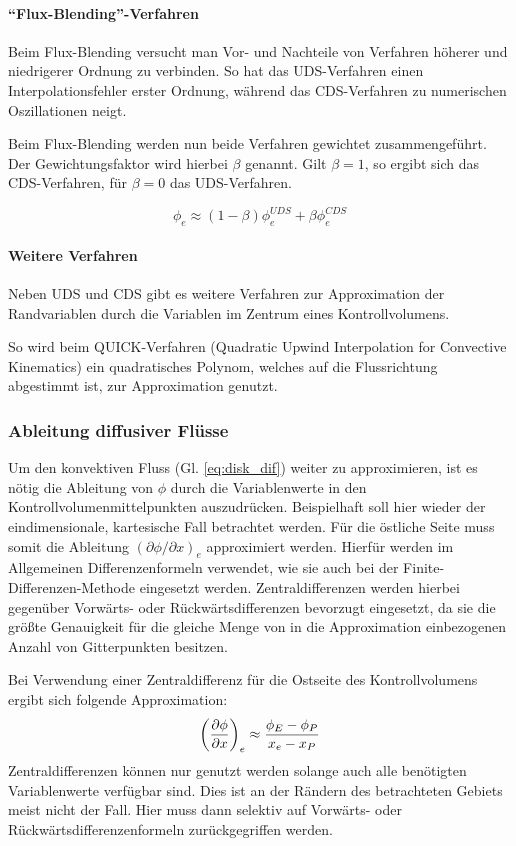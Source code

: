 \paragraph{``Flux-Blending''-Verfahren}

Beim Flux-Blending versucht man Vor- und Nachteile von Verfahren höherer und niedrigerer
Ordnung zu verbinden. So hat das UDS-Verfahren einen Interpolationsfehler erster Ordnung,
während das CDS-Verfahren zu numerischen Oszillationen neigt.

Beim Flux-Blending werden nun beide Verfahren gewichtet zusammengeführt. Der Gewichtungsfaktor
wird hierbei $\beta$ genannt. Gilt $\beta = 1$, so ergibt sich das CDS-Verfahren, für
$\beta = 0$ das UDS-Verfahren.

\begin{equation}
  \phi_e \approx (1-\beta)\phi_e^{UDS} + \beta \phi_e^{CDS}
  \label{eq:flux_blending}
\end{equation}



\paragraph{Weitere Verfahren}
Neben UDS und CDS gibt es weitere Verfahren zur Approximation der Randvariablen durch
die Variablen im Zentrum eines Kontrollvolumens.

So wird beim QUICK-Verfahren (Quadratic Upwind Interpolation for Convective
Kinematics) ein quadratisches Polynom, welches auf die Flussrichtung abgestimmt ist,
zur Approximation genutzt.



\subsubsection{Ableitung diffusiver Flüsse}
\label{sec:dif_fluss}

Um den konvektiven Fluss (Gl. \ref{eq:disk_dif}) weiter zu approximieren, ist es nötig die Ableitung von
$\phi$ durch die Variablenwerte in den Kontrollvolumenmittelpunkten auszudrücken.
Beispielhaft soll hier wieder der eindimensionale, kartesische Fall betrachtet werden.
Für die östliche Seite muss somit die Ableitung $(\partial \phi /\partial x)_e$ approximiert werden.
Hierfür werden im Allgemeinen Differenzenformeln verwendet, wie sie auch bei der
Finite-Differenzen-Methode eingesetzt werden. Zentraldifferenzen werden hierbei
gegenüber Vorwärts- oder Rückwärtsdifferenzen bevorzugt eingesetzt, da sie die größte
Genauigkeit für die gleiche Menge von in die Approximation einbezogenen Anzahl von Gitterpunkten
besitzen.

Bei Verwendung einer Zentraldifferenz für die Ostseite des Kontrollvolumens ergibt sich folgende
Approximation:
\begin{equation}
  \left({\pder[\phi]{x}}\right)_e \approx \frac{\phi_E -\phi_P}{x_e-x_P}
\end{equation}
Zentraldifferenzen können nur genutzt werden solange auch alle benötigten Variablenwerte
verfügbar sind. Dies ist an der Rändern des betrachteten Gebiets meist nicht der Fall.
Hier muss dann selektiv auf Vorwärts- oder Rückwärtsdifferenzenformeln zurückgegriffen werden.
